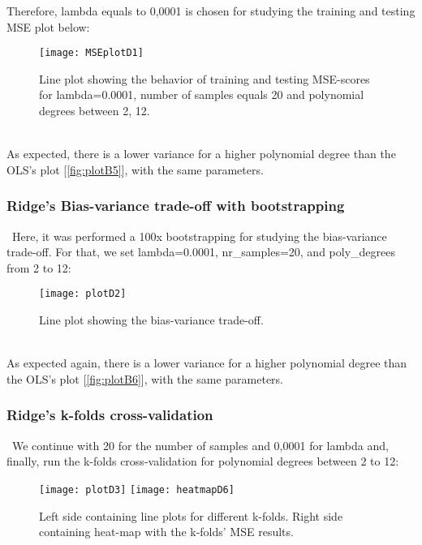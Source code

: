 Therefore, lambda equals to 0,0001 is chosen for studying the training and testing MSE plot below: \\

\begin{figure}[H]
\label{fig:MSEplotD1}
\centering
\texttt{[image: MSEplotD1]}
\caption{Line plot showing the behavior of training and testing MSE-scores for lambda=0.0001, number of samples equals 20 and polynomial degrees between 2, 12.}
\end{figure}\\

As expected,  there is a lower variance for a higher polynomial degree than the OLS's plot [\ref{fig:plotB5}], with the same parameters. \\

\subsubsection{Ridge's Bias-variance trade-off with bootstrapping}
\label{chap:Ridge's Bias-variance trade-off with bootstrapping}

\quad \, Here, it was performed a 100x bootstrapping for studying the bias-variance trade-off. For that, we set lambda=0.0001, nr\_samples=20, and poly\_degrees from 2 to 12: \\

\begin{figure}[H]
\label{fig:BiasplotD2}
\centering
\texttt{[image: plotD2]}
\caption{Line plot showing the bias-variance trade-off.}
\end{figure}\\

As expected again, there is a lower variance for a higher polynomial degree than the OLS's plot [\ref{fig:plotB6}], with the same parameters.\\

\subsubsection{Ridge's k-folds cross-validation}
\label{chap:Ridge's k-folds cross-validation}

\quad \, We continue with 20 for the number of samples and 0,0001 for lambda and, finally, run the k-folds cross-validation for polynomial degrees between 2 to 12:\\

\begin{figure}[H]
\label{fig:plotD3andh6}
\centering
\texttt{[image: plotD3]}
\texttt{[image: heatmapD6]}
\caption{Left side containing line plots for different k-folds. Right side containing heat-map with the k-folds' MSE results.}
\end{figure}\\

